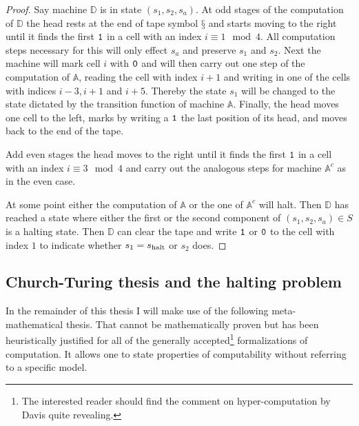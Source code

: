\begin{proof}
  Say machine \(\mathbb{D}\) is in state \((s_1, s_2, s_a)\). At odd stages of
  the computation of \(\mathbb{D}\) the head rests at the end of tape symbol
  \(§\) and starts moving to the right until it finds the first \(\mathtt{1}\) in a
  cell with an index \(i \equiv 1 \mod 4\). All computation steps necessary for
  this will only effect \(s_a\) and preserve \(s_1\) and \(s_2\).
  Next the machine will mark cell \(i\) with \(\mathtt{0}\) and will then carry out
  one step of the computation of \(\mathbb{A}\), reading the cell with index \(i
  + 1\) and writing in one of the cells with indices \(i - 3, i + 1\) and \(i +
  5\). Thereby the state \(s_1\) will be changed to the state dictated by the
  transition function of machine \(\mathbb{A}\).
  Finally, the head moves one cell to the left, marks by writing a \(\mathtt{1}\) the
  last position of its head, and moves back to the end of the tape.

  Add even stages the head moves to the right until it finds the first \(\mathtt{1}\)
  in a cell with an index \(i \equiv 3 \mod 4\) and carry out the analogous
  steps for machine \(\mathbb{A}^c\) as in the even case.

  At some point either the computation of \(\mathbb{A}\) or the one of
  \(\mathbb{A}^c\) will halt. Then \(\mathbb{D}\) has reached a state where
  either the first or the second component of \((s_1, s_2, s_a) ∈ S\) is a
  halting state. Then \(\mathbb{D}\) can clear the tape and write \(\mathtt{1}\) or
  \(\mathtt{0}\) to the cell with index \(1\) to indicate whether \(s_1 = s_{\text{halt}}\) or
  \(s_2\) does.
\end{proof}

\subsection{Church-Turing thesis and the halting problem}

In the remainder of this thesis I will make use of the following
meta-mathematical thesis. That cannot be mathematically proven but has been
heuristically justified for all of the generally accepted\footnote{The
interested reader should find the comment \cite{Davis2006} on hyper-computation
by Davis quite revealing.} formalizations of computation. It allows one to state
properties of computability without referring to a specific model.

